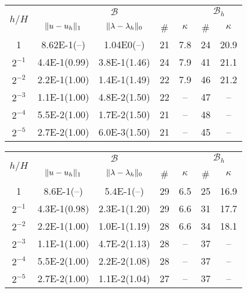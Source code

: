 \begin{table}
    \scriptsize{%
  \begin{center}
    \begin{tabular}{c|cccc||cc}
      \hline
      \multirow{2}{*}{$h/H$} & \multicolumn{4}{c||}{$\mathcal{B}$} & \multicolumn{2}{c}{$\mathcal{B}_{h}$}\\
      \cline{2-7}
      & $\lVert{u-u_h}\rVert_1$ & $\lVert{\lambda-\lambda_h}\rVert_0$ & \# & $\kappa$ & \# & $\kappa$\\
      \hline
1        & 8.62E-1(--)  & 1.04E0(--)    &   21 & 7.8  & 24 & 20.9 \\
$2^{-1}$ & 4.4E-1(0.99) & 3.8E-1(1.46)  & 24   & 7.9  & 41 & 21.1 \\
$2^{-2}$ & 2.2E-1(1.00) & 1.4E-1(1.49)  & 22   & 7.9  & 46 & 21.2 \\
$2^{-3}$ & 1.1E-1(1.00) & 4.8E-2(1.50)  & 22   & --   & 47 & --   \\
$2^{-4}$ & 5.5E-2(1.00) & 1.7E-2(1.50)  & 21   & --   & 48 & --   \\
$2^{-5}$ & 2.7E-2(1.00) & 6.0E-3(1.50)  & 21   & --   & 45 & --   \\
\hline
  \end{tabular}
  \end{center}
    }
    \vspace{5pt}
  \scriptsize{%
    \begin{minipage}{0.49\textwidth}
  \begin{center}
    \begin{tabular}{c|cccc||cc}
      \hline
      \multirow{2}{*}{$h/H$} & \multicolumn{4}{c||}{$\mathcal{B}$} & \multicolumn{2}{c}{$\mathcal{B}_{h}$}\\
      \cline{2-7}
      & $\lVert{u-u_h}\rVert_1$ & $\lVert{\lambda-\lambda_h}\rVert_0$ & \# & $\kappa$ & \# & $\kappa$\\
      \hline
1       & 8.6E-1(--) & 5.4E-1(--)    & 29 & 6.5 & 25 & 16.9\\
$2^{-1}$ & 4.3E-1(0.98) & 2.3E-1(1.20)& 29 & 6.6 & 31 & 17.7\\
$2^{-2}$ & 2.2E-1(1.00) & 1.0E-1(1.19)& 28 & 6.6 & 34 & 18.1\\
$2^{-3}$ & 1.1E-1(1.00) & 4.7E-2(1.13)& 28 & --   & 37 & --   \\
$2^{-4}$ & 5.5E-2(1.00) & 2.2E-2(1.08)& 28 & --   & 37 & --   \\
$2^{-5}$ & 2.7E-2(1.00) & 1.1E-2(1.04)& 27 & --   & 37 & --   \\
\hline
  \end{tabular}
  \end{center}

\end{minipage}}
\end{table}
